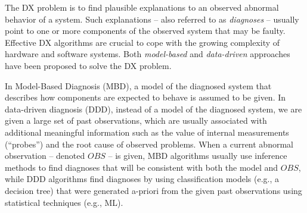 \documentclass[12pt]{article}
\begin{document}
The DX problem is to find plausible explanations to an observed abnormal behavior of a system. Such explanations -- also referred to as {\em diagnoses} -- usually point to one or more components of the observed system that may be faulty. 
Effective DX algorithms are crucial to cope with the growing complexity of hardware and software systems. 
Both  {\em model-based} and {\em data-driven} approaches have been proposed to solve the DX problem. 


In Model-Based Diagnosis (MBD), a model of the diagnosed system that describes how components are expected to behave is assumed to be given. In data-driven diagnosis (DDD), instead of a model of the diagnosed system, we are given a large set of past observations, which are usually associated with additional meaningful information such as the value of internal measurements (``probes'') and the root cause of observed problems. 
When a current abnormal observation -- denoted $OBS$ -- is given, MBD algorithms usually use inference methods to find diagnoses that will be consistent with both the model and $OBS$, while DDD algorithms find diagnoses by using classification models (e.g., a decision tree) that were generated a-priori from the given past observations using statistical techniques (e.g., ML). 
\end{document}
